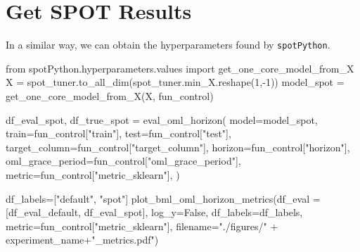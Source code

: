 \documentclass[
  letterpaper,
  DIV=11,
  numbers=noendperiod]{scrreprt}
\newenvironment{Shaded}{\begin{snugshade}}{\end{snugshade}}
\newcommand{\DecValTok}[1]{\textcolor[rgb]{0.68,0.00,0.00}{#1}}
\newcommand{\ImportTok}[1]{\textcolor[rgb]{0.00,0.46,0.62}{#1}}
\newcommand{\NormalTok}[1]{\textcolor[rgb]{0.00,0.23,0.31}{#1}}
\newcommand{\OperatorTok}[1]{\textcolor[rgb]{0.37,0.37,0.37}{#1}}
\newcommand{\StringTok}[1]{\textcolor[rgb]{0.13,0.47,0.30}{#1}}
\newcommand{\VariableTok}[1]{\textcolor[rgb]{0.07,0.07,0.07}{#1}}
\begin{document}
\section{Get SPOT Results}\label{get-spot-results-1}

In a similar way, we can obtain the hyperparameters found by
\texttt{spotPython}.

\begin{Shaded}
\begin{Highlighting}[]
\ImportTok{from}\NormalTok{ spotPython.hyperparameters.values }\ImportTok{import}\NormalTok{ get\_one\_core\_model\_from\_X}
\NormalTok{X }\OperatorTok{=}\NormalTok{ spot\_tuner.to\_all\_dim(spot\_tuner.min\_X.reshape(}\DecValTok{1}\NormalTok{,}\OperatorTok{{-}}\DecValTok{1}\NormalTok{))}
\NormalTok{model\_spot }\OperatorTok{=}\NormalTok{ get\_one\_core\_model\_from\_X(X, fun\_control)}
\end{Highlighting}
\end{Shaded}

\begin{Shaded}
\begin{Highlighting}[]
\NormalTok{df\_eval\_spot, df\_true\_spot }\OperatorTok{=}\NormalTok{ eval\_oml\_horizon(}
\NormalTok{                    model}\OperatorTok{=}\NormalTok{model\_spot,}
\NormalTok{                    train}\OperatorTok{=}\NormalTok{fun\_control[}\StringTok{"train"}\NormalTok{],}
\NormalTok{                    test}\OperatorTok{=}\NormalTok{fun\_control[}\StringTok{"test"}\NormalTok{],}
\NormalTok{                    target\_column}\OperatorTok{=}\NormalTok{fun\_control[}\StringTok{"target\_column"}\NormalTok{],}
\NormalTok{                    horizon}\OperatorTok{=}\NormalTok{fun\_control[}\StringTok{"horizon"}\NormalTok{],}
\NormalTok{                    oml\_grace\_period}\OperatorTok{=}\NormalTok{fun\_control[}\StringTok{"oml\_grace\_period"}\NormalTok{],}
\NormalTok{                    metric}\OperatorTok{=}\NormalTok{fun\_control[}\StringTok{"metric\_sklearn"}\NormalTok{],}
\NormalTok{                )}
\end{Highlighting}
\end{Shaded}

\begin{Shaded}
\begin{Highlighting}[]
\NormalTok{df\_labels}\OperatorTok{=}\NormalTok{[}\StringTok{"default"}\NormalTok{, }\StringTok{"spot"}\NormalTok{]}
\NormalTok{plot\_bml\_oml\_horizon\_metrics(df\_eval }\OperatorTok{=}\NormalTok{ [df\_eval\_default, df\_eval\_spot], log\_y}\OperatorTok{=}\VariableTok{False}\NormalTok{, df\_labels}\OperatorTok{=}\NormalTok{df\_labels, metric}\OperatorTok{=}\NormalTok{fun\_control[}\StringTok{"metric\_sklearn"}\NormalTok{], filename}\OperatorTok{=}\StringTok{"./figures/"} \OperatorTok{+}\NormalTok{ experiment\_name}\OperatorTok{+}\StringTok{"\_metrics.pdf"}\NormalTok{)}
\end{Highlighting}
\end{Shaded}
\end{document}
